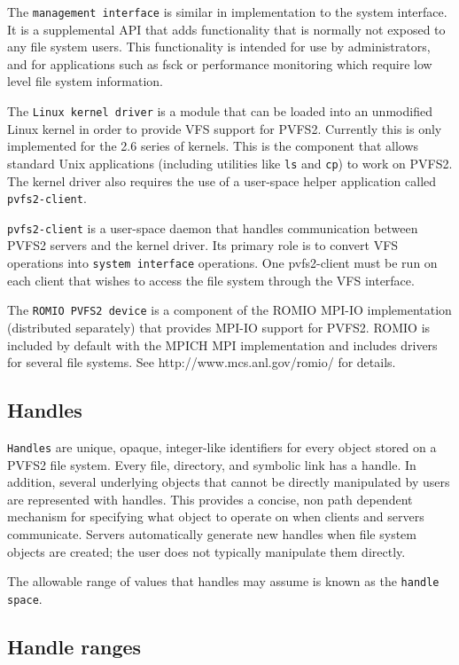 The \texttt{management interface} is similar in implementation to the system
interface.  It is a supplemental API that adds functionality that is normally
not exposed to any file system users.  This functionality is
intended for use by administrators, and for applications such as fsck or 
performance monitoring which require low level file system information.

The \texttt{Linux kernel driver} is a module that can be loaded into an
unmodified Linux kernel in order to provide VFS support for PVFS2.  Currently
this is only implemented for the 2.6 series of kernels.  This is the component
that allows standard Unix applications (including utilities like \texttt{ls}
and \texttt{cp}) to work on PVFS2.  The kernel driver also requires the
use of a user-space helper application called \texttt{pvfs2-client}.

\texttt{pvfs2-client} is a user-space daemon that handles communication between
PVFS2 servers and the kernel driver.  Its primary role is to convert VFS
operations into \texttt{system interface} operations.  One pvfs2-client must
be run on each client that wishes to access the file system through the VFS
interface.

The \texttt{ROMIO PVFS2 device} is a component of the ROMIO MPI-IO
implementation (distributed separately) that provides MPI-IO support
for PVFS2.  ROMIO is included by default with the MPICH MPI implementation
and includes drivers for several file systems.  See 
http://www.mcs.anl.gov/romio/ for details.

\subsection{Handles}

\texttt{Handles} are unique, opaque, integer-like identifiers for every
object stored on a PVFS2 file system.  Every file, directory, and 
symbolic link has a handle.  In addition, several underlying objects
that cannot be directly manipulated by users are represented with 
handles.  This provides a concise, non path dependent mechanism for
specifying what object to operate on when clients and servers 
communicate.  Servers automatically generate new handles when file 
system objects are created; the user does not typically manipulate them
directly.

The allowable range of values that handles may assume is known as the 
\texttt{handle space}.

\subsection{Handle ranges}

